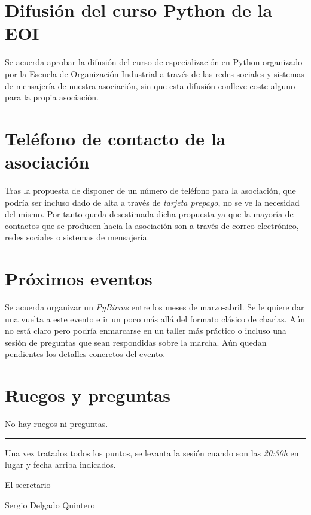 \documentclass[a4paper, 12pt]{article}
\begin{document}
\section{Difusión del curso Python de la EOI}

Se acuerda aprobar la difusión del \href{http://a.eoi.es/ampz}{curso de especialización en Python} organizado por la \href{https://www.eoi.es/}{Escuela de Organización Industrial} a través de las redes sociales y sistemas de mensajería de nuestra asociación, sin que esta difusión conlleve coste alguno para la propia asociación.

\section{Teléfono de contacto de la asociación}

Tras la propuesta de disponer de un número de teléfono para la asociación, que podría ser incluso dado de alta a través de \textit{tarjeta prepago}, no se ve la necesidad del mismo. Por tanto queda desestimada dicha propuesta ya que la mayoría de contactos que se producen hacia la asociación son a través de correo electrónico, redes sociales o sistemas de mensajería.

\section{Próximos eventos}

Se acuerda organizar un \textit{PyBirras} entre los meses de marzo-abril. Se le quiere dar una vuelta a este evento e ir un poco más allá del formato clásico de charlas. Aún no está claro pero podría enmarcarse en un taller más práctico o incluso una sesión de preguntas que sean respondidas sobre la marcha. Aún quedan pendientes los detalles concretos del evento.

\section{Ruegos y preguntas}

No hay ruegos ni preguntas.


\vspace{1cm}
\hrule
\vspace{3mm}

Una vez tratados todos los puntos, se levanta la sesión cuando son las \textit{20:30h} en lugar y fecha arriba indicados.

\begin{flushright}
El secretario

Sergio Delgado Quintero
\end{flushright}
\end{document}
